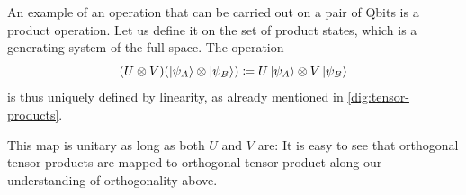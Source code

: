 
An example of an operation that can be carried out on a pair of Qbits is a product operation. 
Let us define it on the set of product states, which is a generating system of the full space.
The operation 
\begin{equation}\label{eq:product-operations}
(U \otimes V)(\ket{\psi_A} \otimes \ket{\psi_B}) \coloneq U\ket{\psi_A} \otimes V\ket{\psi_B}
\end{equation}
is thus uniquely defined by linearity,
as already mentioned in \autoref{dig:tensor-products}.



This map is unitary as long as both $U$ and $V$ are: It is easy to see that orthogonal tensor products are mapped to orthogonal tensor product along our understanding of orthogonality above.

